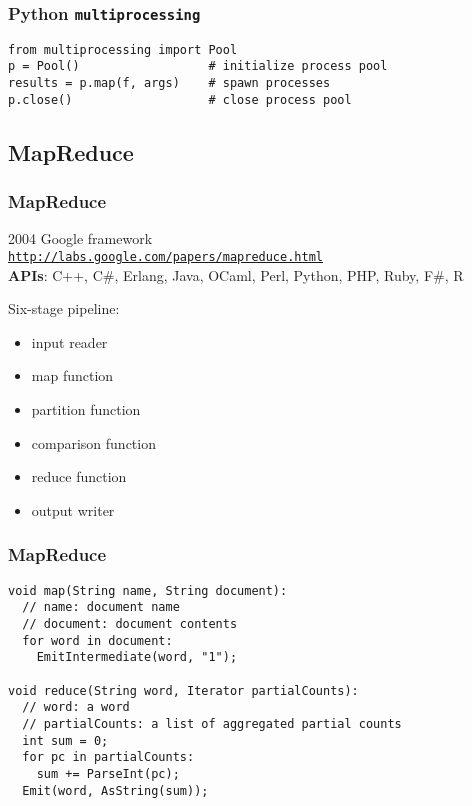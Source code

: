 \documentclass{beamer}
\begin{document}
\begin{frame}[fragile]
\frametitle{Python \texttt{multiprocessing}}
\begin{verbatim}
from multiprocessing import Pool
p = Pool()                  # initialize process pool
results = p.map(f, args)    # spawn processes
p.close()                   # close process pool 
\end{verbatim}
\end{frame}

\subsection{MapReduce}
\begin{frame}
\frametitle{MapReduce}
2004 Google framework\\
\texttt{\url{http://labs.google.com/papers/mapreduce.html}}\\
\textbf{APIs}: C++, C\#, Erlang, Java, OCaml, Perl, Python, PHP, Ruby, F\#, R

\pause \bigskip

Six-stage pipeline:
\begin{itemize}
  \item input reader
  \item map function
  \item partition function
  \item comparison function
  \item reduce function
  \item output writer
\end{itemize}
\end{frame}

\begin{frame}[fragile]
\frametitle{MapReduce}
\begin{verbatim}
void map(String name, String document):
  // name: document name
  // document: document contents
  for word in document:
    EmitIntermediate(word, "1");
 
void reduce(String word, Iterator partialCounts):
  // word: a word
  // partialCounts: a list of aggregated partial counts
  int sum = 0;
  for pc in partialCounts:
    sum += ParseInt(pc);
  Emit(word, AsString(sum));
\end{verbatim}
\end{frame}
\end{document}
